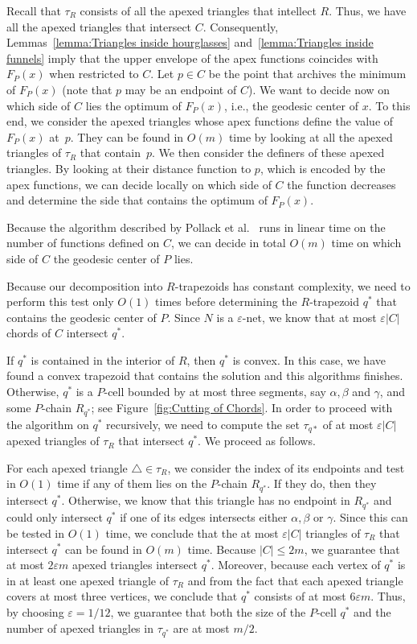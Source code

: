 \documentclass[a4paper,UKenglish]{lipics}
\newcommand{\F}[2]{\ensuremath{F_{\scriptscriptstyle #1}(#2)}}
\begin{document}
Recall that $\tau_R$ consists of all the apexed triangles that intellect $R$. 
Thus, we have all the apexed triangles that intersect $C$. Consequently, Lemmas~\ref{lemma:Triangles inside hourglasses} and~\ref{lemma:Triangles inside funnels} imply that the upper envelope of the apex functions coincides with $\F{P}{x}$ when restricted to $C$.
Let $p\in C$ be the point that archives the minimum of $\F{P}{x}$ (note that $p$ may be an endpoint of $C$). 
We want to decide now on which side of $C$ lies the optimum of $\F{P}{x}$, i.e., the geodesic center of $x$. 
To this end, we consider the apexed triangles whose apex functions define the value of $\F{P}{x}$ at~$p$. 
They can be found in $O(m)$ time by looking at all the apexed triangles of $\tau_R$ that contain~$p$. 
We then consider the definers of these apexed triangles. By looking at their distance function to $p$, which is encoded by the apex functions, we can decide locally on which side of $C$ the function decreases and determine the side that contains the optimum of $\F{P}{x}$.

Because the algorithm described by Pollack et al.~\cite[Section~3]{pollackComputingCenter} runs in linear time on the number of functions defined on $C$, we can decide in total $O(m)$ time on which side of $C$ the geodesic center of $P$ lies. 

Because our decomposition into $R$-trapezoids has constant complexity, we need to perform this test only $O(1)$ times before determining the $R$-trapezoid $q^*$ that contains the geodesic center of $P$. 
Since $N$ is a $\varepsilon$-net, we know that at most $\varepsilon |C|$ chords of $C$ intersect $q^*$.

If $q^*$ is contained in the interior of $R$, then $q^*$ is convex. In this case, we have found a convex trapezoid that contains the solution and this algorithms finishes. Otherwise, $q^*$ is a $P$-cell bounded by at most three segments, say $\alpha, \beta$ and $\gamma$, and some $P$-chain $R_{q^*}$; see Figure~\ref{fig:Cutting of Chords}. 
In order to proceed with the algorithm on  $q^*$ recursively, we need to compute the set $\tau_{q*}$ of at most $\varepsilon |C|$ apexed triangles of $\tau_R$ that intersect $q^*$. We proceed as follows.

For each apexed triangle $\triangle\in \tau_R$, we consider the index of its endpoints and test in $O(1)$ time if any of them lies on the $P$-chain $R_{q^*}$. If they do, then they intersect $q^*$. Otherwise, we know that this triangle has no endpoint in $R_{q^*}$ and could only intersect $q^*$ if one of its edges intersects either $\alpha, \beta$ or $\gamma$. Since this can be tested in $O(1)$ time, we conclude that the at most $\varepsilon |C|$ triangles of $\tau_R$ that intersect $q^*$ can be found in $O(m)$ time.
Because $|C| \leq 2m$, we guarantee that at most $2\varepsilon m$ apexed triangles intersect $q^*$. 
Moreover, because each vertex of $q^*$ is in at least one apexed triangle of $\tau_R$ and from the fact that each apexed triangle covers at most three vertices, we conclude that $q^*$ consists of at most $6 \varepsilon m$.
Thus, by choosing $\varepsilon = 1/12$, we guarantee that both the size of the $P$-cell $q^*$ and the number of apexed triangles in $\tau_{q^*}$ are at most $m/2$.
\end{document}
